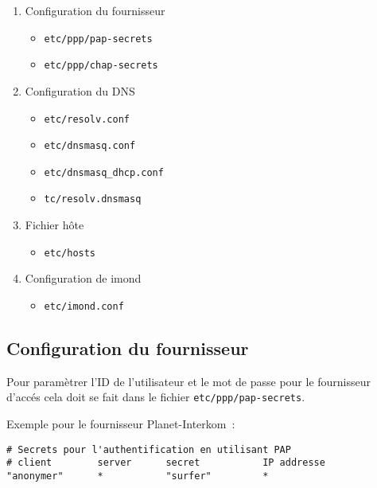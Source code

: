 \begin{enumerate}
\item Configuration du fournisseur
  \begin{itemize}
  \item         \texttt{etc/ppp/pap-secrets}

  \item         \texttt{etc/ppp/chap-secrets}
  \end{itemize}

\item Configuration du DNS
  \begin{itemize}
  \item         \texttt{etc/resolv.conf}

  \item         \texttt{etc/dnsmasq.conf}

  \item         \texttt{etc/dnsmasq\_dhcp.conf}

  \item         \texttt{tc/resolv.dnsmasq}
  \end{itemize}

\item Fichier hôte
  \begin{itemize}
  \item         \texttt{etc/hosts}
  \end{itemize}

\item Configuration de imond
  \begin{itemize}
  \item         \texttt{etc/imond.conf}
  \end{itemize}
\end{enumerate}


\subsection{Configuration du fournisseur}

Pour paramètrer l'ID de l'utilisateur et le mot de passe pour le fournisseur d'accés
cela doit se fait dans le fichier \texttt{etc/ppp/pap-secrets}.

Exemple pour le fournisseur Planet-Interkom~:

\begin{example}
\begin{verbatim}
# Secrets pour l'authentification en utilisant PAP
# client        server      secret           IP addresse
"anonymer"      *           "surfer"         *
\end{verbatim}
\end{example}

